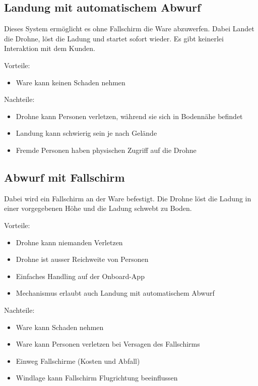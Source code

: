 \subsection{Landung mit automatischem Abwurf}

Dieses System ermöglicht es ohne Fallschirm die Ware abzuwerfen. Dabei Landet die Drohne, löst die Ladung und startet sofort wieder. Es gibt keinerlei Interaktion mit dem Kunden.

Vorteile:
\begin{itemize}
	\item Ware kann keinen Schaden nehmen
\end{itemize}


Nachteile:
\begin{itemize}
	\item Drohne kann Personen verletzen, während sie sich in Bodennähe befindet
	\item Landung kann schwierig sein je nach Gelände
	\item Fremde Personen haben physischen Zugriff auf die Drohne
\end{itemize}


\subsection{Abwurf mit Fallschirm}

Dabei wird ein Fallschirm an der Ware befestigt. Die Drohne löst die Ladung in einer vorgegebenen Höhe und die Ladung schwebt zu Boden.


Vorteile:
\begin{itemize}
	\item Drohne kann niemanden Verletzen 
	\item Drohne ist ausser Reichweite von Personen
	\item Einfaches Handling auf der Onboard-App
	\item Mechanismus erlaubt auch Landung mit automatischem Abwurf
\end{itemize}


Nachteile:
\begin{itemize}
	\item Ware kann Schaden nehmen
	\item Ware kann Personen verletzen bei Versagen des Fallschirms
	\item Einweg Fallschirme (Kosten und Abfall)
	\item Windlage kann Fallschirm Flugrichtung beeinflussen
\end{itemize}


